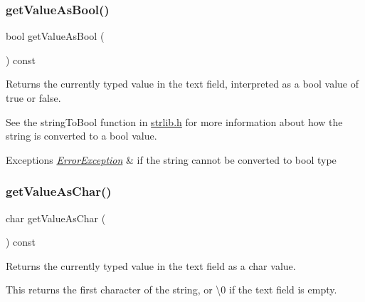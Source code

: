 \subsubsection{\texorpdfstring{get\+Value\+As\+Bool()}{getValueAsBool()}}
{\footnotesize\ttfamily bool get\+Value\+As\+Bool (\begin{DoxyParamCaption}{ }\end{DoxyParamCaption}) const\hspace{0.3cm}{\ttfamily [virtual]}}



Returns the currently typed value in the text field, interpreted as a bool value of true or false. 

See the string\+To\+Bool function in \mbox{\hyperlink{strlib_8h_source}{strlib.\+h}} for more information about how the string is converted to a bool value. 
\begin{DoxyExceptions}{Exceptions}
{\em \mbox{\hyperlink{classErrorException}{Error\+Exception}}} & if the string cannot be converted to bool type \\
\hline
\end{DoxyExceptions}
\mbox{\label{classGTextField_a562f514fc055aaa37ca3145fc7abde8e}} 
\subsubsection{\texorpdfstring{get\+Value\+As\+Char()}{getValueAsChar()}}
{\footnotesize\ttfamily char get\+Value\+As\+Char (\begin{DoxyParamCaption}{ }\end{DoxyParamCaption}) const\hspace{0.3cm}{\ttfamily [virtual]}}



Returns the currently typed value in the text field as a char value. 

This returns the first character of the string, or \textquotesingle{}\textbackslash{}0\textquotesingle{} if the text field is empty. \mbox{\label{classGTextField_aab9a19edbd1548d557721e0b695295f8}} 
